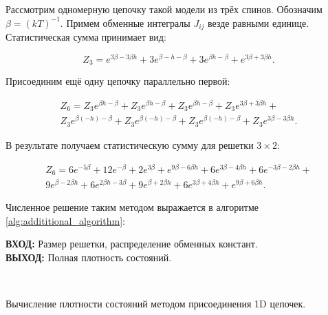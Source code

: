 \documentclass[utf8, babel, sor, jor, amsmath, amssymb, reprint]{elsarticle} %
\begin{document}
Рассмотрим одномерную цепочку такой модели из трёх спинов. Обозначим $\beta = (kT)^{-1}$. Примем обменные интегралы $J_{ij}$ везде равными единице. Статистическая сумма принимает вид:

\begin{equation}
	Z_3 = e^{3\beta - 3\beta h} + 3e^{\beta - h - \beta} + 3e^{\beta h - \beta} + e^{3\beta + 3\beta h}.
	\label{eq:stat_3}
\end{equation}

Присоединим ещё одну цепочку параллельно первой:

\begin{equation}
	\label{eq:stat_3_un}
	\begin{alignedat}{2}
		Z_6 = Z_3 e^{\beta  h-\beta }+Z_3 e^{\beta  h-\beta }+Z_3 e^{\beta  h-\beta }+Z_3 e^{3 \beta +3 \beta  h}+ \\
		Z_3 e^{\beta  (-h)-\beta }+Z_3 e^{\beta  (-h)-\beta }+Z_3 e^{\beta  (-h)-\beta }+Z_3 e^{3 \beta -3 \beta  h}.
	\end{alignedat}
\end{equation}

В результате получаем статистическую сумму для решетки $3 \times 2$:

\begin{equation}
	\label{eq:stat_3_res}
	\begin{alignedat}{2}
		Z_6 = 6 e^{-5 \beta }+12 e^{-\beta }+2 e^{3 \beta }+e^{9 \beta -6 \beta  h}+6 e^{3 \beta -4 \beta  h}+6 e^{-3 \beta -2 \beta  h}+\\
		9 e^{\beta -2 \beta  h}+6 e^{2 \beta  h-3 \beta }+9 e^{\beta +2 \beta  h}+6 e^{3 \beta +4 \beta  h}+e^{9 \beta +6 \beta  h}.
	\end{alignedat}
\end{equation}

Численное решение таким методом выражается в алгоритме \ref{alg:addititional_algorithm}:


\begin{algorithm}[H]
	\textbf{ВХОД:} Размер решетки, распределение обменных констант.\\
	\textbf{ВЫХОД:} Полная плотность состояний.
	\begin{algorithmic}
		{
			{
			}
			\ENDFOR\\
		}
		\ENDFOR
	\end{algorithmic}
	\caption{Вычисление плотности состояний методом присоединения 1D цепочек.}
	\label{alg:addititional_algorithm}
\end{algorithm}
\end{document}
